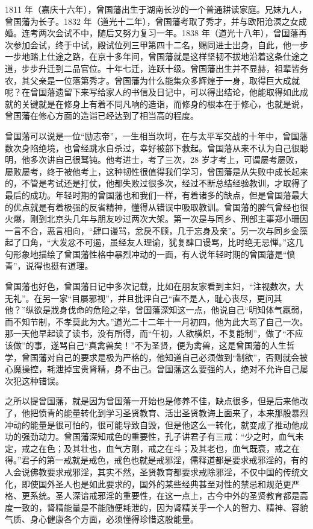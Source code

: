 1811 年（嘉庆十六年），曾国藩出生于湖南长沙的一个普通耕读家庭。兄妹九人，曾国藩为长子。1832 年（道光十二年），曾国藩考取了秀才，并与欧阳沧溟之女成婚。连考两次会试不中，随后又努力复习一年。1838 年（道光十八年），曾国藩再次参加会试，终于中试，殿试位列三甲第四十二名，赐同进士出身，自此，他一步一步地踏上仕途之路，在京十多年间，曾国藩就是这样坚韧不拔地沿着这条仕途之道，步步升迁到二品官位。十年七迁，连跃十级。曾国藩出生并不显赫，祖辈皆务农，其父亲是一位落第秀才。曾国藩为什么能集众多辉煌于一身，取得巨大成就呢？在曾国藩遗留下来写给家人的书信及日记中，可以得出结论，他能取得如此成就的关键就是在修身上有着不同凡响的造诣，而修身的根本在于修心，也就是说，曾国藩在修心方面的造诣已经达到了相当高的程度。

曾国藩可以说是一位“励志帝”，一生相当坎坷，在与太平军交战的十年中，曾国藩数次身陷绝境，也曾经跳水自杀过，幸好被部下救起。曾国藩从来不认为自己很聪明，他多次讲自己很驽钝。他考进士，考了三次，28 岁才考上，可谓屡考屡败，屡败屡考，终于被他考上，这种韧性很值得我们学习，曾国藩是从失败中成长起来的，不管是考试还是打仗，他都失败过很多次，经过不断总结经验教训，才取得了最后的成功。年轻时期的曾国藩也和我们一样，有着诸多的缺点，但是曾国藩最大的优点就是有着极强的反省精神，懂得从错误中吸取教训。曾国藩的脾气曾经也很火爆，刚到北京头几年与朋友吵过两次大架。第一次是与同乡、刑部主事郑小珊因一言不合，恶言相向，“肆口谩骂，忿戾不顾，几于忘身及亲”。另一次与同乡金藻起了口角，“大发忿不可遏，虽经友人理谕，犹复肆口谩骂，比时绝无忌惮。”这几句形象地描绘了曾国藩性格中暴烈冲动的一面，有人说年轻时期的曾国藩是“愤青”，说得也挺有道理。

曾国藩也好色，曾国藩日记中多次记载，比如在朋友家看到主妇，“注视数次，大无礼”。在另一家“目屡邪视”，并且批评自己“直不是人，耻心丧尽，更问其他？”纵欲是戕身伐命的危险之举，曾国藩深知这一点，他说自己“明知体气羸弱，而不知节制，不孝莫此为大。”道光二十二年十一月初四，他为此大骂了自己一次。那一天他早起读了读书，没有所得，而“午初，人欲横炽，不复能制”，做了“不应该做”的事，遂骂自己“真禽兽矣！”不为圣贤，便为禽兽，这是曾国藩的人生哲学，曾国藩对自己的要求是极为严格的，他知道自己必须做到“制欲”，否则就会被心魔操控，耗泄掉宝贵肾精，身不由己。曾国藩这么要强的人，绝对不允许自己屡次犯这种错误。

之所以提曾国藩，就是因为曾国藩一开始也是修养不佳，缺点很多，但是后来他改了，他把愤青的能量转化到学习圣贤教育、活出圣贤教诲上面来了，本来那股暴烈冲动的能量是很可怕的，很可能导致自毁，但是他这么一转化，就变成了推动他成功的强劲动力。曾国藩深知戒色的重要性，孔子讲君子有三戒：“少之时，血气未定，戒之在色；及其壮也，血气方刚，戒之在斗；及其老也，血气既衰，戒之在得。”君子的第一戒就是戒色，戒色也就是戒邪淫，儒释道都是要求戒邪淫的，有的人会说佛教要求戒邪淫，其实不然，圣贤教育都要求戒除邪淫，不仅中国的传统文化，即使国外圣人也是如此要求的，国外的某些经典甚至对性的禁忌和规范更严格、更系统。圣人深谙戒邪淫的重要性，在这一点上，古今中外的圣贤教育都是高度一致的，肾精能量是不能随便耗泄的，因为肾精关乎一个人的智力、精神、容貌气质、身心健康各个方面，必须懂得珍惜这股能量。

